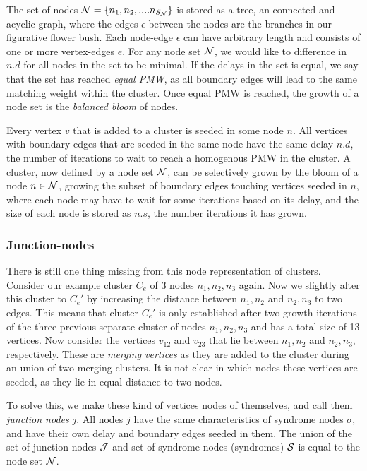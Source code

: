 The set of nodes $\mathcal{N} = \{n_1, n_2, .... n_{S_{\mathcal{N}}}\}$ is stored as a tree, an connected and acyclic graph, where the edges $\epsilon$ between the nodes are the branches in our figurative flower bush. Each node-edge $\epsilon$ can have arbitrary length and consists of one or more vertex-edges $e$. For any node set $\mathcal{N}$, we would like to difference in $n.d$ for all nodes in the set to be minimal. If the delays in the set is equal, we say that the set has reached \emph{equal PMW}, as all boundary edges will lead to the same matching weight within the cluster. Once equal PMW is reached, the growth of a node set is the \emph{balanced bloom} of nodes.

\begin{lemma}
  Every vertex $v$ that is added to a cluster is seeded in some node $n$. All vertices with boundary edges that are seeded in the same node have the same delay $n.d$, the number of iterations to wait to reach a homogenous PMW in the cluster. A cluster, now defined by a node set $\mathcal{N}$, can be selectively grown by the bloom of a node $n \in \mathcal{N}$, growing the subset of boundary edges touching vertices seeded in $n$, where each node may have to wait for some iterations based on its delay, and the size of each node is stored as $n.s$, the number iterations it has grown.
\end{lemma}

\subsubsection{Junction-nodes}

There is still one thing missing from this node representation of clusters. Consider our example cluster $C_e$ of 3 nodes $n_1, n_2, n_3$ again. Now we slightly alter this cluster to $C_e'$ by increasing the distance between $n_1, n_2$ and $n_2, n_3$ to two edges. This means that cluster $C_e'$ is only established after two growth iterations of the three previous separate cluster of nodes $n_1, n_2, n_3$ and has a total size of 13 vertices. Now consider the vertices $v_{12}$ and $v_{23}$ that lie between $n_1, n_2$ and $n_2, n_3$, respectively. These are \emph{merging vertices} as they are added to the cluster during an union of two merging clusters. It is not clear in which nodes these vertices are seeded, as they lie in equal distance to two nodes.

To solve this, we make these kind of vertices nodes of themselves, and call them \emph{junction nodes} $j$. All nodes $j$ have the same characteristics of syndrome nodes $\sigma$, and have their own delay and boundary edges seeded in them. The union of the set of junction nodes $\mathcal{J}$ and set of syndrome nodes (syndromes) $\mathcal{S}$ is equal to the node set $\mathcal{N}$.

